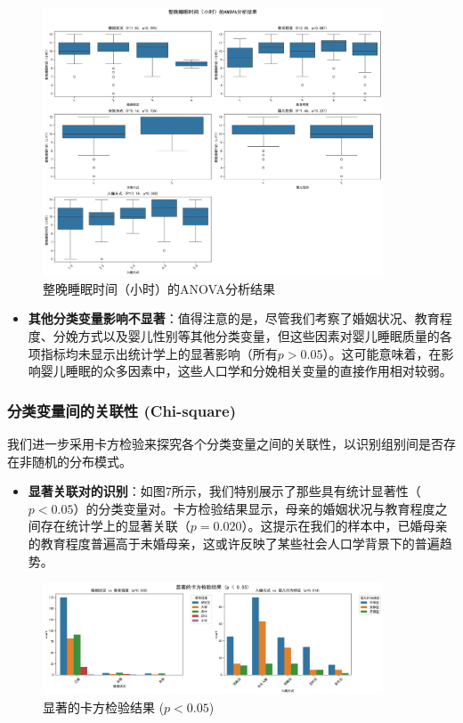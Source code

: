 \documentclass[withoutpreface,bwprint]{cumcmthesis}
\begin{document}
\begin{figure}[htbp]
    \centering
    \includegraphics[width=0.9\textwidth]{figures/anova_整晚睡眠时间（小时）_combined.png}
    \caption{整晚睡眠时间（小时）的ANOVA分析结果}
    \label{fig:anova_sleep_time}
\end{figure}

\begin{itemize}
    \item \textbf{其他分类变量影响不显著}：值得注意的是，尽管我们考察了婚姻状况、教育程度、分娩方式以及婴儿性别等其他分类变量，但这些因素对婴儿睡眠质量的各项指标均未显示出统计学上的显著影响（所有$p>0.05$）。这可能意味着，在影响婴儿睡眠的众多因素中，这些人口学和分娩相关变量的直接作用相对较弱。
\end{itemize}

\subsubsection{分类变量间的关联性 (Chi-square)}
我们进一步采用卡方检验来探究各个分类变量之间的关联性，以识别组别间是否存在非随机的分布模式。
\begin{itemize}
    \item \textbf{显著关联对的识别}：如图7所示，我们特别展示了那些具有统计显著性（$p<0.05$）的分类变量对。卡方检验结果显示，母亲的婚姻状况与教育程度之间存在统计学上的显著关联（$p=0.020$）。这提示在我们的样本中，已婚母亲的教育程度普遍高于未婚母亲，这或许反映了某些社会人口学背景下的普遍趋势。
\end{itemize}

\begin{figure}[htbp]
    \centering
    \includegraphics[width=0.9\textwidth]{figures/chi_square_significant_results.png}
    \caption{显著的卡方检验结果 ($p < 0.05$)}
    \label{fig:chi_square_significant}
\end{figure}
\end{document}
